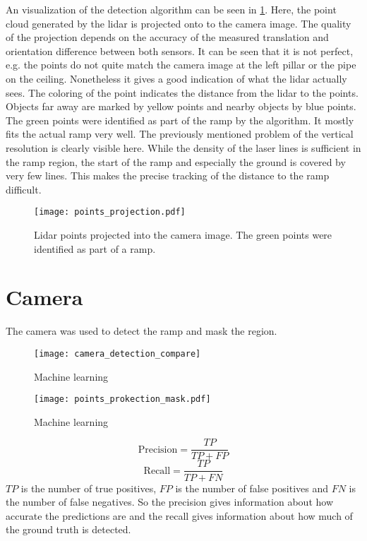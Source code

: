An visualization of the detection algorithm can be seen in \cref{fig:points_projection}.
Here, the point cloud generated by the \gls{lidar} is projected onto to the camera image.
The quality of the projection depends on the accuracy of the measured translation and orientation difference between both sensors.
It can be seen that it is not perfect, e.g. the points do not quite match the camera image at the left pillar or the pipe on the ceiling.
Nonetheless it gives a good indication of what the \gls{lidar} actually sees.
The coloring of the point indicates the distance from the \gls{lidar} to the points.
Objects far away are marked by yellow points and nearby objects by blue points.
The green points were identified as part of the ramp by the algorithm.
It mostly fits the actual ramp very well.
The previously mentioned problem of the vertical resolution is clearly visible here.
While the density of the laser lines is sufficient in the ramp region, the start of the ramp and especially the ground is covered by very few lines.
This makes the precise tracking of the distance to the ramp difficult.
\begin{figure}[htbp]
	\centering
	\texttt{[image: points\_projection.pdf]}
	\caption{Lidar points projected into the camera image. The green points were identified as part of a ramp.}
	\label{fig:points_projection}
\end{figure}



\section{Camera}
The camera was used to detect the ramp and mask the region.
\begin{figure}[htbp]
	\centering
	\texttt{[image: camera\_detection\_compare]}
	\caption{Machine learning}
	\label{fig:camera_detection_compare}
\end{figure}
\begin{figure}[htbp]
	\centering
	\texttt{[image: points\_prokection\_mask.pdf]}
	\caption{Machine learning}
	\label{fig:points_prokection_mask}
\end{figure}
\begin{equation}
	\text{Precision} = \frac{TP}{TP+FP}
\end{equation}
\begin{equation}
	\text{Recall} = \frac{TP}{TP+FN}
\end{equation}
$TP$ is the number of true positives, $FP$ is the number of false positives and $FN$ is the number of false negatives.
So the precision gives information about how accurate the predictions are and the recall gives information about how much of the ground truth is detected.

